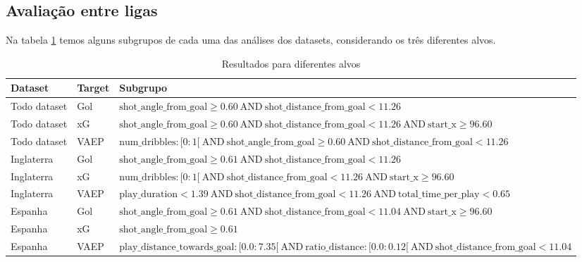 \documentclass{article}
\begin{document}
\subsection{Avaliação entre ligas}

Na tabela \ref{tab:resultsSD} temos alguns subgrupos de cada uma das análises dos datasets, 
considerando os três diferentes alvos.

\begin{table}[H]
    \centering
    \begin{tabularx}{\textwidth}{|l|l|X|}
        \hline
        \textbf{Dataset} & \textbf{Target} & \textbf{Subgrupo} \\
        \hline
        Todo dataset & Gol & $ \text{shot\_angle\_from\_goal} \geq 0.60 \ \text{AND} \ \text{shot\_distance\_from\_goal} < 11.26 $ \\
        \hline
        Todo dataset & xG & $ \text{shot\_angle\_from\_goal} \geq 0.60 \ \text{AND} \ \text{shot\_distance\_from\_goal} < 11.26 \ \text{AND} \ \text{start\_x} \geq 96.60 $ \\
        \hline
        Todo dataset & VAEP & $ \text{num\_dribbles} : [0:1[ \ \text{AND} \ \text{shot\_angle\_from\_goal} \geq 0.60 \ \text{AND} \ \text{shot\_distance\_from\_goal} < 11.26 $ \\
        \hline
        Inglaterra & Gol & $ \text{shot\_angle\_from\_goal} \geq 0.61 \ \text{AND} \ \text{shot\_distance\_from\_goal} < 11.26 $ \\
        \hline
        Inglaterra & xG & $ \text{num\_dribbles} : [0:1[ \ \text{AND} \ \text{shot\_distance\_from\_goal} < 11.26 \ \text{AND} \ \text{start\_x} \geq 96.60 $ \\
        \hline
        Inglaterra & VAEP & $ \text{play\_duration} < 1.39 \ \text{AND} \ \text{shot\_distance\_from\_goal} < 11.26 \ \text{AND} \ \text{total\_time\_per\_play} < 0.65 $ \\
        \hline
        Espanha & Gol & $ \text{shot\_angle\_from\_goal} \geq 0.61 \ \text{AND} \ \text{shot\_distance\_from\_goal} < 11.04 \ \text{AND} \ \text{start\_x} \geq 96.60 $ \\
        \hline
        Espanha & xG & $ \text{shot\_angle\_from\_goal} \geq 0.61 $ \\
        \hline
        Espanha & VAEP & $ \text{play\_distance\_towards\_goal} : [0.0:7.35[ \ \text{AND} \ \text{ratio\_distance} : [0.0:0.12[ \ \text{AND} \ \text{shot\_distance\_from\_goal} < 11.04 $ \\
        \hline
    \end{tabularx}
    \caption{Resultados para diferentes alvos}
    \label{tab:resultsSD}
\end{table}
\end{document}
